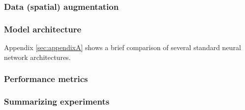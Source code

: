 


\subsubsection{Data (spatial) augmentation}



\subsubsection{Model architecture}



Appendix \ref*{sec:appendixA} shows a brief comparison of several standard neural network architectures.





\subsubsection{Performance metrics}




\subsubsection{Summarizing experiments}



